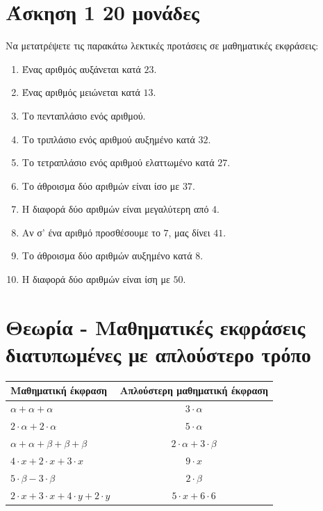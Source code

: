 \documentclass[a4paper,10pt]{report}
\begin{document}
\section*{Άσκηση 1  \hfill \small{20 μονάδες}}
Να μετατρέψετε τις παρακάτω λεκτικές προτάσεις σε μαθηματικές εκφράσεις:
\begin{enumerate}[1)]
 \item Ένας αριθμός αυξάνεται κατά $23$.
 \item Ένας αριθμός μειώνεται κατά $13$.
 \item Το πενταπλάσιο ενός αριθμού.
 \item Το τριπλάσιο ενός αριθμού αυξημένο κατά $32$.
 \item Το τετραπλάσιο ενός αριθμού ελαττωμένο κατά $27$.
 \item Το άθροισμα δύο αριθμών είναι ίσο με $37$.
 \item Η διαφορά δύο αριθμών είναι μεγαλύτερη από $4$.
 \item Αν σ' ένα αριθμό προσθέσουμε το $7$, μας δίνει $41$.
 \item Το άθροισμα δύο αριθμών αυξημένο κατά $8$.
 \item Η διαφορά δύο αριθμών είναι ίση με $50$.
\end{enumerate}




\section*{Θεωρία - Μαθηματικές εκφράσεις διατυπωμένες με απλούστερο τρόπο \hfill \small{}}
\begin{center}
 \begin{tabular}{|l|c|}\hline 
\textbf{Μαθηματική έκφραση} \quad        &    \textbf{Απλούστερη μαθηματική έκφραση}       \\
\hline 
$α+α+α$                                  &  $3\cdot α$\\ 
\hline
$2\cdot α+2\cdot α$                      &  $5\cdot α$        \\                        
\hline
$α+α+β+β+β$                              & $2\cdot α+3\cdot β$       \\
\hline
$4\cdot x +2\cdot x+3\cdot x$            &  $9\cdot x$     \\
\hline 
$5\cdot β-3\cdot β$                      & $2\cdot β$       \\
\hline
$2\cdot x+3\cdot x+4\cdot y+2\cdot y$    & $5\cdot x+6\cdot 6$       \\
\hline
\end{tabular}
\end{center}
\end{document}
